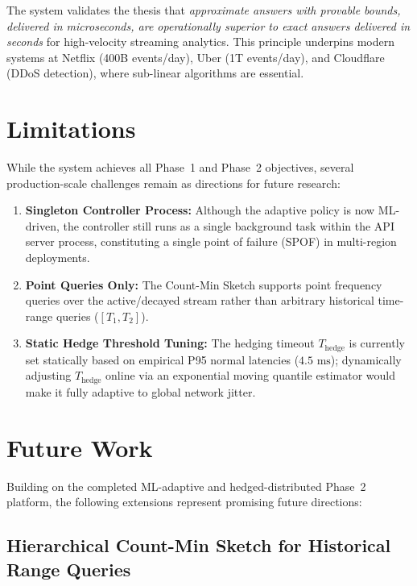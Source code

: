 The system validates the thesis that \textit{approximate answers with provable bounds, delivered in microseconds, are operationally superior to exact answers delivered in seconds} for high-velocity streaming analytics. This principle underpins modern systems at Netflix (400B events/day), Uber (1T events/day), and Cloudflare (DDoS detection), where sub-linear algorithms are essential.


\section{Limitations}

While the system achieves all Phase~1 and Phase~2 objectives, several production-scale challenges remain as directions for future research:

\begin{enumerate}
 \item \textbf{Singleton Controller Process:} Although the adaptive policy is now ML-driven, the controller still runs as a single background task within the API server process, constituting a single point of failure (SPOF) in multi-region deployments.

 \item \textbf{Point Queries Only:} The Count-Min Sketch supports point frequency queries over the active/decayed stream rather than arbitrary historical time-range queries ($[T_1, T_2]$).

 \item \textbf{Static Hedge Threshold Tuning:} The hedging timeout $T_{\text{hedge}}$ is currently set statically based on empirical P95 normal latencies ($4.5\text{ ms}$); dynamically adjusting $T_{\text{hedge}}$ online via an exponential moving quantile estimator would make it fully adaptive to global network jitter.
\end{enumerate}


\section{Future Work}
\label{sec:future_work}

Building on the completed ML-adaptive and hedged-distributed Phase~2 platform, the following extensions represent promising future directions:

\subsection{Hierarchical Count-Min Sketch for Historical Range Queries}

